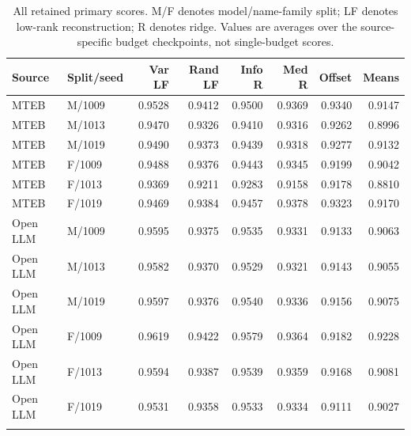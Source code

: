 \documentclass{article}
\begin{document}
\begin{table}[h]
\centering\footnotesize
\begin{tabular}{llrrrrrr}\toprule Source & Split/seed & Var LF & Rand LF & Info R & Med R & Offset & Means \\ \midrule
MTEB & M/1009 & 0.9528 & 0.9412 & 0.9500 & 0.9369 & 0.9340 & 0.9147 \\
MTEB & M/1013 & 0.9470 & 0.9326 & 0.9410 & 0.9316 & 0.9262 & 0.8996 \\
MTEB & M/1019 & 0.9490 & 0.9373 & 0.9439 & 0.9318 & 0.9277 & 0.9132 \\
\addlinespace
MTEB & F/1009 & 0.9488 & 0.9376 & 0.9443 & 0.9345 & 0.9199 & 0.9042 \\
MTEB & F/1013 & 0.9369 & 0.9211 & 0.9283 & 0.9158 & 0.9178 & 0.8810 \\
MTEB & F/1019 & 0.9469 & 0.9384 & 0.9457 & 0.9378 & 0.9323 & 0.9170 \\
\addlinespace
Open LLM & M/1009 & 0.9595 & 0.9375 & 0.9535 & 0.9331 & 0.9133 & 0.9063 \\
Open LLM & M/1013 & 0.9582 & 0.9370 & 0.9529 & 0.9321 & 0.9143 & 0.9055 \\
Open LLM & M/1019 & 0.9597 & 0.9376 & 0.9540 & 0.9336 & 0.9156 & 0.9075 \\
\addlinespace
Open LLM & F/1009 & 0.9619 & 0.9422 & 0.9579 & 0.9364 & 0.9182 & 0.9228 \\
Open LLM & F/1013 & 0.9594 & 0.9387 & 0.9539 & 0.9359 & 0.9168 & 0.9081 \\
Open LLM & F/1019 & 0.9531 & 0.9358 & 0.9533 & 0.9334 & 0.9111 & 0.9027 \\
\addlinespace
\bottomrule\end{tabular}
\caption{All retained primary scores. M/F denotes model/name-family split; LF denotes low-rank reconstruction; R denotes ridge. Values are averages over the source-specific budget checkpoints, not single-budget scores.}
\label{tab:seeds}
\end{table}
\end{document}
